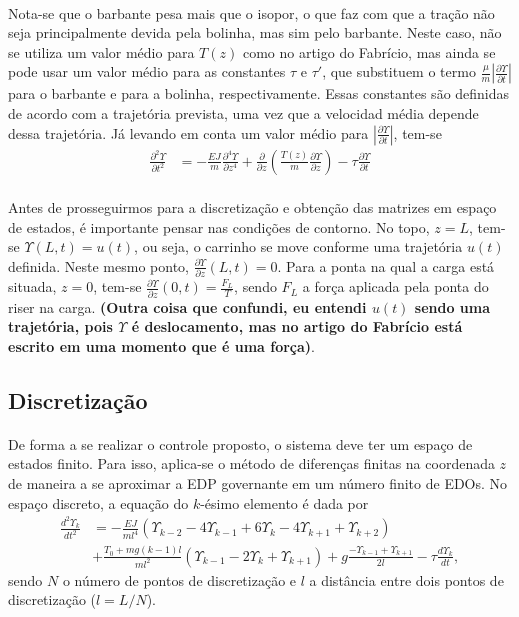 \documentclass[a4paper,11pt]{scrartcl} %
\numberwithin{equation}{section} %
\numberwithin{figure}{section} %
\numberwithin{table}{section} %
\begin{document}
\paragraph{} Nota-se que o barbante pesa mais que o isopor, o que faz com que a tração não seja principalmente devida pela bolinha, mas sim pelo barbante. Neste caso, não se utiliza um valor médio para $T(z)$ como no artigo do Fabrício, mas ainda se pode usar um valor médio para as constantes $\tau$ e $\tau'$, que substituem o termo $\frac{\mu}{m}\left|\frac{\partial \Upsilon}{\partial t}\right|$ para o barbante e para a bolinha, respectivamente. Essas constantes são definidas de acordo com a trajetória prevista, uma vez que a velocidad média depende dessa trajetória. Já levando em conta um valor médio para $\left|\frac{\partial \Upsilon}{\partial t}\right|$, tem-se \begin{align}
	\frac{\partial^2 \Upsilon}{\partial t^2} &= -\frac{EJ}{m}\frac{\partial^4 \Upsilon}{\partial z^4} + \frac{\partial}{\partial z}\left(\frac{T(z)}{m}\frac{\partial \Upsilon}{\partial z}\right) - \tau\frac{\partial \Upsilon}{\partial t}\label{EquacaoComTau}
	\end{align}

\paragraph{} Antes de prosseguirmos para a discretização e obtenção das matrizes em espaço de estados, é importante pensar nas condições de contorno. No topo, $z=L$, tem-se $\Upsilon(L,t)=u(t)$, ou seja, o carrinho se move conforme uma trajetória $u(t)$ definida. Neste mesmo ponto, $\frac{\partial\Upsilon}{\partial z}(L,t) = 0$. Para a ponta na qual a carga está situada, $z=0$, tem-se $\frac{\partial\Upsilon}{\partial z}(0,t) = \frac{F_L}{T}$, sendo $F_L$ a força aplicada pela ponta do riser na carga. \textbf{(Outra coisa que confundi, eu entendi $u(t)$ sendo uma trajetória, pois $\Upsilon$ é deslocamento, mas no artigo do Fabrício está escrito em uma momento que é uma força)}.

\subsection{Discretização}
\paragraph{} De forma a se realizar o controle proposto, o sistema deve ter um espaço de estados finito. Para isso, aplica-se o método de diferenças finitas na coordenada $z$ de maneira a se aproximar a EDP governante em um número finito de EDOs. No espaço discreto, a equação do $k$-ésimo elemento é dada por \begin{align}
	\frac{d^2\Upsilon_k}{dt^2} &= -\frac{EJ}{m l^4}\left(\Upsilon_{k-2} - 4\Upsilon_{k-1}+6\Upsilon_{k}-4\Upsilon_{k+1}+\Upsilon_{k+2}\right)\nonumber\\
	&+ \frac{T_0+mg(k-1)l}{m l^2}\left(\Upsilon_{k-1}-2\Upsilon_{k} + \Upsilon_{k+1}\right)+g\frac{-\Upsilon_{k-1}+\Upsilon_{k+1}}{2l}-\tau\frac{d\Upsilon_k}{dt},
\end{align} sendo $N$ o número de pontos de discretização e $l$ a distância entre dois pontos de discretização ($l = L/N$).
\end{document}
